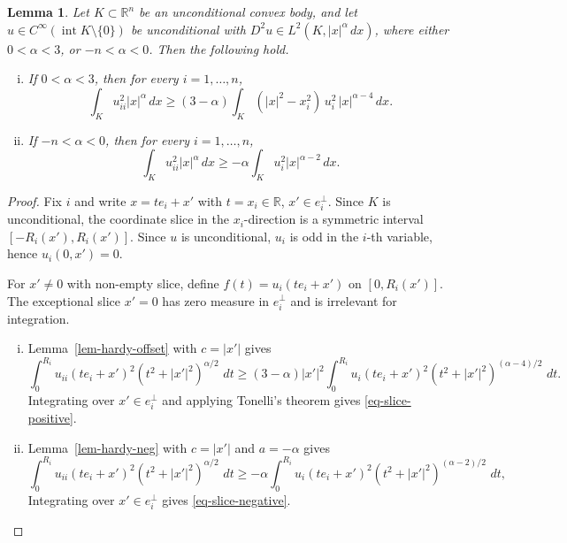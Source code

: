 \documentclass[12pt,leqno]{amsart}
\theoremstyle{plain} \newtheorem{thm}{Theorem}[section]
\theoremstyle{plain} \newtheorem{prop}[thm]{Proposition}
\theoremstyle{plain} \newtheorem{prob}[thm]{Problem}
\theoremstyle{definition} \newtheorem{defi}[thm]{Definition}
\theoremstyle{plain} \newtheorem{cor}[thm]{Corollary}
\theoremstyle{plain} \newtheorem{lem}[thm]{Lemma}
\theoremstyle{plain} \newtheorem{eg}{Example}[section]
\theoremstyle{remark} \newtheorem{rmk}[thm]{Remark}
\theoremstyle{plain} \newtheorem{conj}{Conjecture}
\numberwithin{equation}{section}
\newcommand{\dd}{\,d}
\newcommand{\R}{\mathbb{R}}
\begin{document}
\begin{lem}\label{lem-slice} 
Let $K\subset\R^n$ be an unconditional convex body, and let $u\in C^\infty(\operatorname{int}K\setminus\{0\})$ be unconditional with $D^2u\in L^2(K,|x|^\alpha\,dx)$, where either $0<\alpha<3$, or $-n<\alpha<0$. Then the following hold.
\begin{enumerate}[(i)]
\item  If $0<\alpha<3$, then for every $i=1,\dots,n$,
\begin{equation}\label{eq-slice-positive}
 \int_K u_{ii}^2|x|^\alpha\,dx
 \ge
 (3-\alpha)\int_K (|x|^2-x_i^2)\,u_i^2\,|x|^{\alpha-4}\,dx .
\end{equation}

\item If $-n<\alpha<0$, then for every $i=1,\dots,n$, 
\begin{equation}\label{eq-slice-negative}
 \int_K u_{ii}^2|x|^{\alpha}\,dx
 \ge -\alpha\int_K u_i^2 |x|^{\alpha-2}\,dx .
\end{equation}
\end{enumerate}
\end{lem}

\begin{proof}
Fix $i$ and write $x=te_i+x'$ with $t=x_i\in\R$,
$x'\in e_i^\perp$. Since $K$ is unconditional, the coordinate
slice in the $x_i$-direction is a symmetric interval
$[-R_i(x'),R_i(x')]$.  Since $u$ is unconditional, $u_i$ is odd
in the $i$-th variable, hence $u_i(0,x')=0$.

For $x'\neq0$ with non-empty slice, define
$f(t)=u_i(te_i+x')$ on $[0,R_i(x')]$. The exceptional slice
$x'=0$ has zero measure in $e_i^\perp$ and is irrelevant for integration.

\begin{enumerate}[(i)]
\item 
Lemma~\ref{lem-hardy-offset} with $c=|x'|$ gives
\[
 \int_0^{R_i}
 u_{ii}(te_i+x')^2(t^2+|x'|^2)^{\alpha/2}\,\dd t
 \ge(3-\alpha)|x'|^2
 \int_0^{R_i}
 u_i(te_i+x')^2(t^2+|x'|^2)^{(\alpha-4)/2}\,\dd t.
\]
Integrating over $x'\in e_i^\perp$ and applying Tonelli's theorem gives
\eqref{eq-slice-positive}.

\item 
Lemma~\ref{lem-hardy-neg} with $c=|x'|$ and $a=-\alpha$ gives
\[
 \int_0^{R_i}
 u_{ii}(te_i+x')^2(t^2+|x'|^2)^{\alpha/2}\,\dd t
 \ge
 -\alpha
 \int_0^{R_i} u_i(te_i+x')^2(t^2+|x'|^2)^{(\alpha-2)/2}\,\dd t,
\]
Integrating over $x'\in e_i^\perp$ gives \eqref{eq-slice-negative}.

\end{enumerate}
\end{proof}
\end{document}
